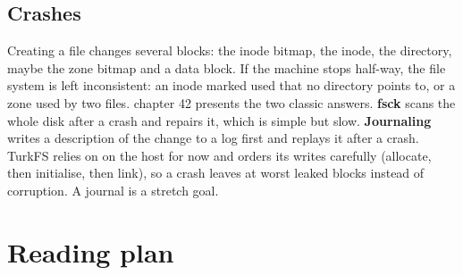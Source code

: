 \documentclass[11pt,a4paper]{article}
\begin{document}
\subsection{Crashes}

Creating a file changes several blocks: the inode bitmap, the inode, the directory, maybe the zone bitmap and a data
block. If the machine stops half-way, the file system is left inconsistent: an inode marked used that no directory
points to, or a zone used by two files. \OSTEP chapter 42 presents the two classic answers. \textbf{fsck} scans the
whole disk after a crash and repairs it, which is simple but slow. \textbf{Journaling} writes a description of the
change to a log first and replays it after a crash. TurkFS relies on  on the host for now and orders
its writes carefully (allocate, then initialise, then link), so a crash leaves at worst leaked blocks instead of
corruption. A journal is a stretch goal.

\section{Reading plan}
\end{document}
